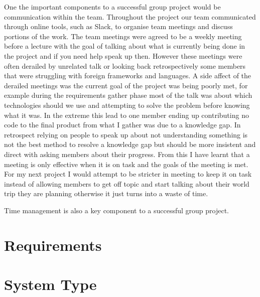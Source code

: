 \documentclass{style/CRPITStyle}
\begin{document}
One the important components to a successful group project would be communication within the team.
Throughout the project our team communicated through online tools, such as
Slack, to organise team meetings and discuss portions of the work. The team
meetings were agreed to be a weekly meeting before a lecture with the goal of
talking about what is currently being done in the project and if you need help
speak up then. However these meetings were often derailed by unrelated talk or
looking back retrospectively some members that were struggling with foreign
frameworks and languages.
A side affect of the derailed meetings was the current goal of the project was
being poorly met, for example during the requirements gather phase most of the
talk was about which technologies should we use and attempting to solve the
problem before knowing what it was.
In the extreme this lead to one member ending up
contributing no code to the final product from what I gather was due to a
knowledge gap. In retrospect relying on people to speak up about not understanding
something is not the best method to resolve a knowledge gap but should be more
insistent and direct with asking members about their progress.
From this I have learnt that a meeting is only effective when it is on task and
the goals of the meeting is met. For my next project I would attempt to be
stricter in meeting to keep it on task instead of allowing members to get off topic
and start talking about their world trip they are planning otherwise it just
turns into a waste of time.

\vspace{.1in}

Time management is also a key component to a successful group project.

\section{Requirements}


\section{System Type}
\end{document}
